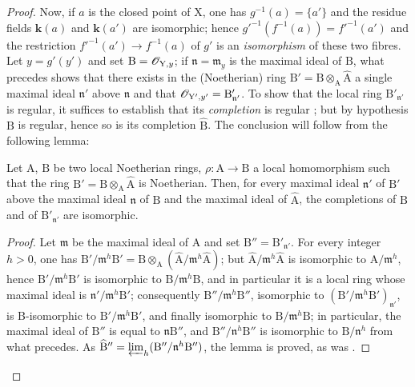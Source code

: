 \begin{proof}
Now, if $a$ is the closed point of $\mathrm{X}$, one has $g^{-1}(a)=\{a'\}$ and the residue fields $\boldsymbol{k}(a)$ and $\boldsymbol{k}(a')$ are isomorphic; hence $g'^{-1}(f^{-1}(a))=f'^{-1}(a')$ and the restriction $f'^{-1}(a')\to f^{-1}(a)$ of $g'$ is an \emph{isomorphism} of these two fibres. Let $y=g'(y')$ and set $\mathrm{B}=\mathscr{O}_{\mathrm{Y},y}$; if $\mathfrak{n}=\mathfrak{m}_y$ is the maximal ideal of $\mathrm{B}$, what precedes shows that there exists in the (Noetherian) ring $\mathrm{B}'=\mathrm{B}\otimes_\mathrm{A}\widehat{\mathrm{A}}$ a single maximal ideal $\mathfrak{n}'$ above $\mathfrak{n}$ and that $\mathscr{O}_{\mathrm{Y}',y'}=\mathrm{B}'_{\mathfrak{n}'}$. To show that the local ring $\mathrm{B}'_{\mathfrak{n}'}$ is regular, it suffices to establish that its \emph{completion} is regular ; but by hypothesis $\mathrm{B}$ is regular, hence so is its completion $\widehat{\mathrm{B}}$. The conclusion will follow from the following lemma:

\begin{lemma}[7.9.3.1]
\label{IV.7.9.3.1}
Let $\mathrm{A}$, $\mathrm{B}$ be two local Noetherian rings, $\rho:\mathrm{A}\to\mathrm{B}$ a local homomorphism such that the ring $\mathrm{B}'=\mathrm{B}\otimes_\mathrm{A}\widehat{\mathrm{A}}$ is Noetherian. Then, for every maximal ideal $\mathfrak{n}'$ of $\mathrm{B}'$ above the maximal ideal $\mathfrak{n}$ of $\mathrm{B}$ and the maximal ideal of $\widehat{\mathrm{A}}$, the completions of $\mathrm{B}$ and of $\mathrm{B}'_{\mathfrak{n}'}$ are isomorphic.
\end{lemma}

\begin{proof}
Let $\mathfrak{m}$ be the maximal ideal of $\mathrm{A}$ and set $\mathrm{B}''=\mathrm{B}'_{\mathfrak{n}'}$. For every integer $h>0$, one has $\mathrm{B}'/\mathfrak{m}^h\mathrm{B}'=\mathrm{B}\otimes_\mathrm{A}(\widehat{\mathrm{A}}/\mathfrak{m}^h\widehat{\mathrm{A}})$; but $\widehat{\mathrm{A}}/\mathfrak{m}^h\widehat{\mathrm{A}}$ is isomorphic to $\mathrm{A}/\mathfrak{m}^h$, hence $\mathrm{B}'/\mathfrak{m}^h\mathrm{B}'$ is isomorphic to $\mathrm{B}/\mathfrak{m}^h\mathrm{B}$, and in particular it is a local ring whose maximal ideal is $\mathfrak{n}'/\mathfrak{m}^h\mathrm{B}'$; consequently $\mathrm{B}''/\mathfrak{m}^h\mathrm{B}''$, isomorphic to $(\mathrm{B}'/\mathfrak{m}^h\mathrm{B}')_{\mathfrak{n}'}$, is B-isomorphic to $\mathrm{B}'/\mathfrak{m}^h\mathrm{B}'$, and finally isomorphic to $\mathrm{B}/\mathfrak{m}^h\mathrm{B}$; in particular, the maximal ideal of $\mathrm{B}''$ is equal to $\mathfrak{n}\mathrm{B}''$, and $\mathrm{B}''/\mathfrak{n}^h\mathrm{B}''$ is isomorphic to $\mathrm{B}/\mathfrak{n}^h$ from what precedes. As $\widehat{\mathrm{B}}''=\varprojlim_h(\mathrm{B}''/\mathfrak{n}^h\mathrm{B}'')$, the lemma is proved, as was .
\end{proof}
\end{proof}

